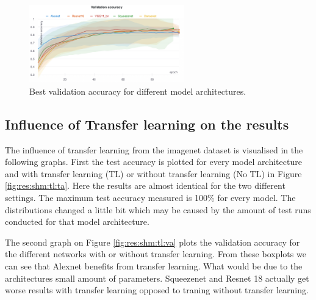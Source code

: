 	\begin{figure}[hbtp]
		\centering
		\includegraphics[width=0.6\textwidth]{fig/results/wandb/second_handmade_sweep/charts/valid_accuracy_median.png}
		\caption{Best validation accuracy for different model architectures.}
	\end{figure}

\subsection{Influence of Transfer learning on the results}
	The influence of transfer learning from the imagenet dataset is visualised in the following graphs. First the test accuracy is plotted for every model architecture and with transfer learning (TL) or without transfer learning (No TL) in Figure \ref{fig:res:shm:tl:ta}. Here the results are almost identical for the two different settings. The maximum test accuracy measured is 100\% for every model. The distributions changed a little bit which may be caused by the amount of test runs conducted for that model architecture.

The second graph on Figure \ref{fig:res:shm:tl:va} plots the validation accuracy for the different networks with or without transfer learning. From these boxplots we can see that Alexnet benefits from transfer learning. What would be due to the architectures small amount of parameters. Squeezenet and Resnet 18 actually get worse results with transfer learning opposed to traning without transfer learning.


